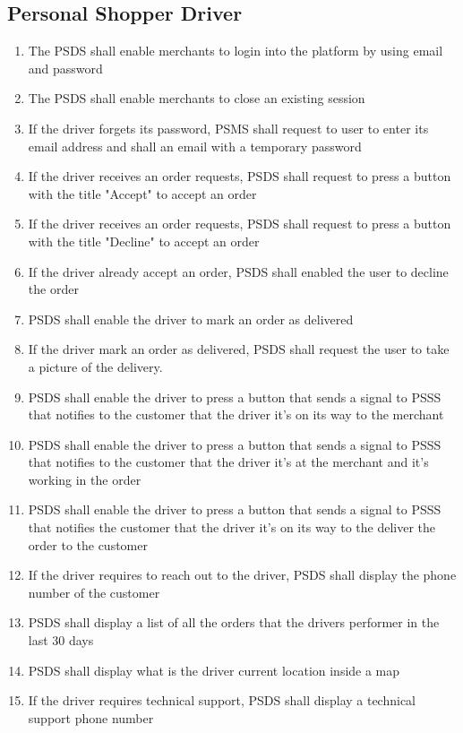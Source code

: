 \subsection{Personal Shopper Driver}
\begin{enumerate}[resume, label=SY-\arabic*]
    \item  The PSDS shall enable merchants to login into the platform by 
    using email and password
    \item  The PSDS shall enable merchants to close an existing session
    \item  If the driver forgets its password, PSMS shall request to user to 
    enter its email address and shall an email with a temporary password
    \item  If the driver receives an order requests, PSDS shall request to 
    press a button with the title "Accept" to accept an order
    \item  If the driver receives an order requests, PSDS shall request to 
    press a button with the title "Decline" to accept an order
    \item  If the driver already accept an order, PSDS shall enabled the 
    user to decline the order
    \item  PSDS shall enable the driver to mark an order as delivered
	\item  If the driver mark an order as delivered, PSDS shall request the 
    user to take a picture of the delivery.
    \item  PSDS shall enable the driver to press a button that sends a signal 
    to PSSS that notifies to the customer that the driver it's on its 
    way to the merchant
    \item  PSDS shall enable the driver to press a button that sends a signal 
    to PSSS that notifies to the customer that the driver it's at the 
    merchant and it's working in the order
    \item  PSDS shall enable the driver to press a button that sends a signal 
    to PSSS that notifies the customer that the driver it's on its way to the 
    deliver the order to the customer
    \item  If the driver requires to reach out to the driver, PSDS shall 
    display the phone number of the customer
    \item  PSDS shall display a list of all the orders that the drivers 
    performer in the last 30 days
    \item  PSDS shall display what is the driver current location inside a map
    \item  If the driver requires technical support, PSDS shall display a 
    technical support phone number
\end{enumerate}
